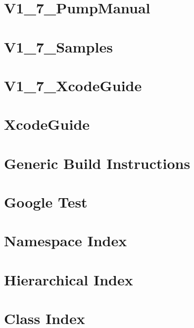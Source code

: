 \documentclass[twoside]{book}
\newcommand{\+}{\discretionary{\mbox{\scriptsize$\hookleftarrow$}}{}{}}
\begin{document}
\chapter{V1\+\_\+7\+\_\+\+Pump\+Manual}
\label{md_vendor_googletest_googletest_docs_V1_7_PumpManual}
\hypertarget{md_vendor_googletest_googletest_docs_V1_7_PumpManual}{}

\chapter{V1\+\_\+7\+\_\+\+Samples}
\label{md_vendor_googletest_googletest_docs_V1_7_Samples}
\hypertarget{md_vendor_googletest_googletest_docs_V1_7_Samples}{}

\chapter{V1\+\_\+7\+\_\+\+Xcode\+Guide}
\label{md_vendor_googletest_googletest_docs_V1_7_XcodeGuide}
\hypertarget{md_vendor_googletest_googletest_docs_V1_7_XcodeGuide}{}

\chapter{Xcode\+Guide}
\label{md_vendor_googletest_googletest_docs_XcodeGuide}
\hypertarget{md_vendor_googletest_googletest_docs_XcodeGuide}{}

\chapter{Generic Build Instructions}
\label{md_vendor_googletest_googletest_README}
\hypertarget{md_vendor_googletest_googletest_README}{}

\chapter{Google Test}
\label{md_vendor_googletest_README}
\hypertarget{md_vendor_googletest_README}{}

\chapter{Namespace Index}

\chapter{Hierarchical Index}

\chapter{Class Index}

\end{document}
